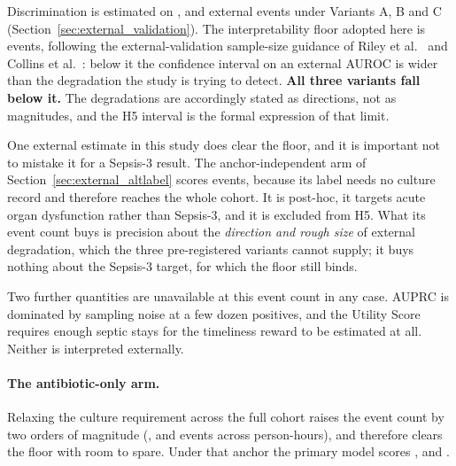 Discrimination is estimated on \pcExtNEventsA{}, \pcExtNEventsB{} and
\pcExtNEventsC{} external events under Variants A, B and C
(Section~\ref{sec:external_validation}). The interpretability floor adopted
here is \pcExtMinEvents{} events, following the external-validation sample-size
guidance of Riley et al.\ \cite{riley2019sample} and Collins et al.\
\cite{collins2024tripodai}: below it the confidence interval on an external
AUROC is wider than the degradation the study is trying to detect.
\textbf{All three variants fall below it.} The degradations are accordingly
stated as directions, not as magnitudes, and the H5 interval is the formal
expression of that limit.

One external estimate in this study does clear the floor, and it is important
not to mistake it for a Sepsis-3 result. The anchor-independent arm of
Section~\ref{sec:external_altlabel} scores \pcExtAltNEvents{} events, because
its label needs no culture record and therefore reaches the whole cohort. It is
post-hoc, it targets acute organ dysfunction rather than Sepsis-3, and it is
excluded from H5. What its event count buys is precision about the
\emph{direction and rough size} of external degradation, which the three
pre-registered variants cannot supply; it buys nothing about the Sepsis-3
target, for which the floor still binds.

Two further quantities are unavailable at this event count in any case. AUPRC is
dominated by sampling noise at a few dozen positives, and the Utility Score
requires enough septic stays for the timeliness reward to be estimated at all.
Neither is interpreted externally.

\paragraph{The antibiotic-only arm.} Relaxing the culture requirement across
the full cohort raises the event count by two orders of magnitude (\pcExtAbxNEventsA, \pcExtAbxNEventsB{} and \pcExtAbxNEventsC{} events across
\pcExtAbxNRows{} person-hours), and therefore clears the floor with room to
spare. Under that anchor the primary model scores \pcExtAbxAurocPrimaryA,
\pcExtAbxAurocPrimaryB{} and \pcExtAbxAurocPrimaryC.

